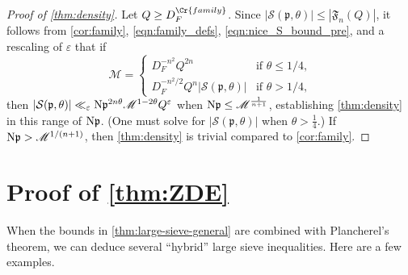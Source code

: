 \documentclass[11pt]{amsart}
\theoremstyle{remark}
\numberwithin{equation}{section}
\newcommand{\kp}{\mathfrak{p}}
\newcommand{\N}{\textnormal{N}}
\renewcommand{\epsilon}{\varepsilon}
\begin{document}
\begin{proof}[Proof of \cref{thm:density}]

Let $Q\geq D_F^{\Cr{family}}$.  Since $|\mathcal{S}(\kp,\theta)|\leq |\mathfrak{F}_n(Q)|$, it follows from \cref{cor:family}, \eqref{eqn:family_defs}, \eqref{eqn:nice_S_bound_pre}, and a rescaling of $\epsilon$ that if
\[
\mathscr{M}=\begin{cases}
	D_F^{-n^2}Q^{2n}&\mbox{if $\theta\leq 1/4$,}\\
	D_F^{-n^2/2}Q^n |\mathcal{S}(\kp,\theta)|&\mbox{if $\theta>1/4$,}
\end{cases}
\]
then $|\mathcal{S}(\kp,\theta)|\ll_{\epsilon}\N\kp^{2n\theta}\mathscr{M}^{1-2\theta}Q^{\epsilon}$ when $\N\kp\leq \mathscr{M}^{\frac{1}{n+1}}$, establishing \cref{thm:density} in this range of $\N\kp$.  (One must solve for $|\mathcal{S}(\kp,\theta)|$ when $\theta>\frac{1}{4}$.)  If $\N\kp>\mathscr{M}^{1/(n+1)}$, then \cref{thm:density} is trivial compared to \cref{cor:family}.
\end{proof}

\section{Proof of \cref{thm:ZDE}}
\label{sec:zero-density}

When the bounds in \cref{thm:large-sieve-general} are combined with Plancherel's theorem, we can deduce several ``hybrid'' large sieve inequalities.  Here are a few examples.
\end{document}
